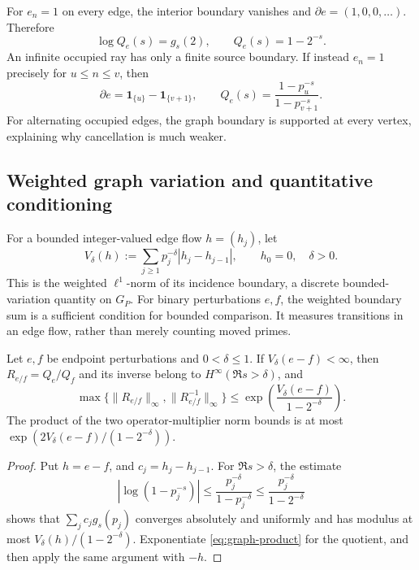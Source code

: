 For \(e_n=1\) on every edge, the interior boundary vanishes and
\(\partial e=(1,0,0,\ldots)\).  Therefore
\[
 \log Q_e(s)=g_s(2),\qquad Q_e(s)=1-2^{-s}.
\]
An infinite occupied ray has only a finite source boundary.  If instead
\(e_n=1\) precisely for \(u\le n\le v\), then
\[
 \partial e=\mathbf 1_{\{u\}}-\mathbf 1_{\{v+1\}},
 \qquad Q_e(s)=\frac{1-p_u^{-s}}{1-p_{v+1}^{-s}}.
\]
For alternating occupied edges, the graph boundary is supported at
every vertex, explaining why cancellation is much weaker.

\subsection{Weighted graph variation and quantitative conditioning}

For a bounded integer-valued edge flow \(h=(h_j)\), let
\begin{equation}\label{eq:graph-TV}
 V_\delta(h):=\sum_{j\ge1}p_j^{-\delta}
                  |h_j-h_{j-1}|,\qquad h_0=0,\quad\delta>0.
\end{equation}
This is the weighted \(\ell^1\)-norm of its incidence boundary,
a discrete bounded-variation quantity on \(G_P\).
For binary perturbations $e,f$, the weighted boundary sum is a sufficient
condition for bounded comparison. It measures transitions in an edge flow,
rather than merely counting moved primes.

\begin{proposition}
\label{prop:graph-conditioning}
Let \(e,f\) be endpoint perturbations and \(0<\delta\le1\).
If \(V_\delta(e-f)<\infty\), then
\(R_{e/f}=Q_e/Q_f\) and its inverse belong to
\(H^\infty(\Re s>\delta)\), and
\begin{equation}\label{eq:graph-stability}
 \max\{\|R_{e/f}\|_\infty,\|R_{e/f}^{-1}\|_\infty\}
 \le \exp\!\left(\frac{V_\delta(e-f)}{1-2^{-\delta}}\right).
\end{equation}
The product of the two operator-multiplier norm bounds is at most
\(\exp(2V_\delta(e-f)/(1-2^{-\delta}))\).
\end{proposition}
\begin{proof}
Put \(h=e-f\), and \(c_j=h_j-h_{j-1}\).
For \(\Re s>\delta\), the estimate
\[
 |\log(1-p_j^{-s})|
 \le \frac{p_j^{-\delta}}{1-p_j^{-\delta}}
 \le \frac{p_j^{-\delta}}{1-2^{-\delta}}
\]
shows that \(\sum_j c_jg_s(p_j)\) converges absolutely and uniformly
and has modulus at most
\(V_\delta(h)/(1-2^{-\delta})\).
Exponentiate \eqref{eq:graph-product} for the quotient, and then
apply the same argument with \(-h\).
\end{proof}

